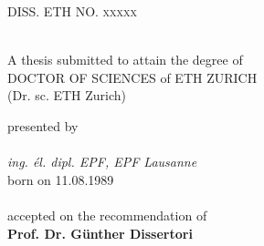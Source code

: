 
\begin{titlepage}

\newcommand{\HRule}{\rule{\linewidth}{0.5mm}} %

\center %
 

\textsc{\LARGE DISS. ETH NO. xxxxx}\\[1.5cm] %

\vspace{2cm}
{ \huge \bfseries \thesistitle}\\[0.4cm] %
\vspace{2cm}

{\Large A thesis submitted to attain the degree of} \\ \vspace{0.5cm}
{\Large DOCTOR OF SCIENCES of ETH ZURICH}\\ \vspace{0.3cm}
{\Large (Dr. sc. ETH Zurich)} \vspace{2cm}


{\Large presented by} \\ \vspace{0.3cm}
{\Large \thesisauthor}\\ \vspace{1cm}
{\Large \textit{ing. \'{e}l. dipl. EPF, EPF Lausanne}}\\ \vspace{1cm}
{\Large born on 11.08.1989} \\
{\Large \thesistown}\\
{\Large accepted on the recommendation of} \\
{\Large \textbf{Prof. Dr. G\"{u}nther Dissertori}} \\


\end{titlepage}
